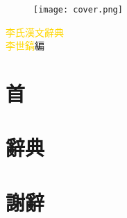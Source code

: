 \documentclass[a5paper,11pt]{report}
\begin{document}
\begin{titlepage}
\doublespacing
\begin{wrapfigure}{r}{50mm}
\texttt{[image: cover.png]}
\end{wrapfigure}
\hfill
\vfill
{\huge\textcolor{gold}{李氏漢文辭典}}\\
{\textcolor{gold}{李世鎬}\hspace{14pt}編}
\vspace{64pt}
\end{titlepage}
\addtolength{\topmargin}{20mm}
\newpage
\chapter*{首}
\doublespacing


\chapter*{辭典}
\begin{multicols}{3}
\onehalfspacing

\end{multicols}

\chapter*{謝辭}
\doublespacing

\end{document}
